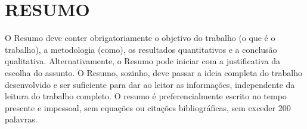 \vspace{1\baselineskip}
\section*{\MakeUppercase{Resumo}}

\vspace{1\baselineskip}
\noindent O Resumo deve conter obrigatoriamente o objetivo do trabalho (o que é o trabalho), a metodologia (como), os resultados quantitativos e a conclusão qualitativa. Alternativamente, o Resumo pode iniciar com a justificativa da escolha do assunto. O Resumo, sozinho, deve passar a ideia completa do trabalho desenvolvido e ser suficiente para dar ao leitor as informações, independente da leitura do trabalho completo. O resumo é preferencialmente escrito no tempo presente e impessoal, sem equações ou citações bibliográficas, sem exceder 200 palavras.
